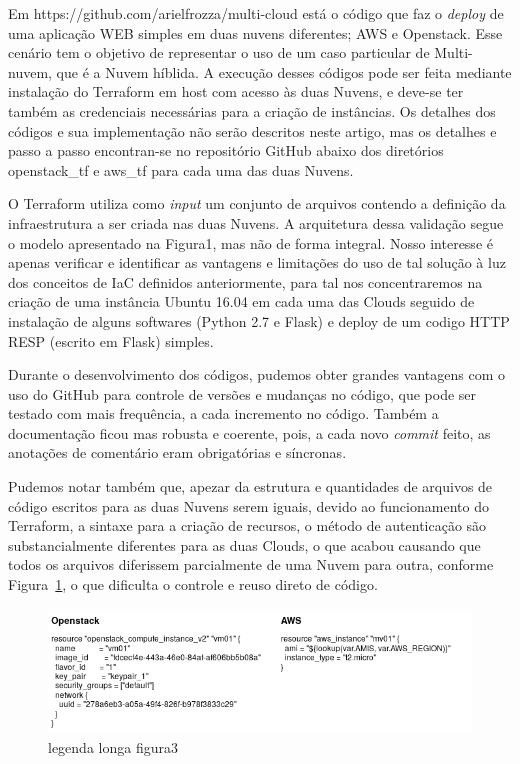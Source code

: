 \documentclass[12pt]{article}
\begin{document}
	Em https://github.com/arielfrozza/multi-cloud está o código que faz o \textit{deploy} de uma aplicação WEB simples em duas nuvens diferentes; AWS e Openstack. Esse cenário tem o objetivo de representar o uso de um caso particular de Multi-nuvem, que é a Nuvem híblida. A execução desses códigos pode ser feita mediante instalação do Terraform em host com acesso às duas Nuvens, e deve-se ter também as credenciais necessárias para a criação de instâncias. Os detalhes dos códigos e sua implementação não serão descritos neste artigo, mas os detalhes e passo a passo encontran-se no repositório GitHub abaixo dos diretórios openstack\_tf e aws\_tf para cada uma das duas Nuvens.
	
	O Terraform utiliza como \textit{input} um conjunto de arquivos contendo a definição da infraestrutura a ser criada nas duas Nuvens. A arquitetura dessa validação segue o modelo apresentado na Figura1, mas não de forma integral. Nosso interesse é apenas verificar e identificar as vantagens e limitações do uso de tal solução à luz dos conceitos de IaC definidos anteriormente, para tal nos concentraremos na criação de uma instância Ubuntu 16.04 em cada uma das Clouds seguido de instalação de alguns softwares (Python 2.7 e Flask) e deploy de um codigo HTTP RESP (escrito em Flask) simples.	
	
	Durante o desenvolvimento dos códigos, pudemos obter grandes vantagens com o uso do GitHub para controle de versões e mudanças no código, que pode ser testado com mais frequência, a cada incremento no código. Também a documentação ficou mas robusta e coerente, pois, a cada novo \textit{commit} feito, as anotações de comentário eram obrigatórias e síncronas.
	
	Pudemos notar também que, apezar da estrutura e quantidades de arquivos de código escritos para as duas Nuvens serem iguais, devido ao funcionamento do Terraform, a sintaxe para a criação de recursos, o método de autenticação são substancialmente diferentes para as duas Clouds, o que acabou causando que todos os arquivos diferissem parcialmente de uma Nuvem para outra, conforme Figura~\ref{fig:figure3}, o que dificulta o controle e reuso direto de código.
		
	\begin{figure}[ht]
		\centering
		\includegraphics[width=0.9\linewidth]{figuras/Figure3.png}
		\caption{legenda longa figura3}
		\label{fig:figure3}
	\end{figure}
	
\end{document}
